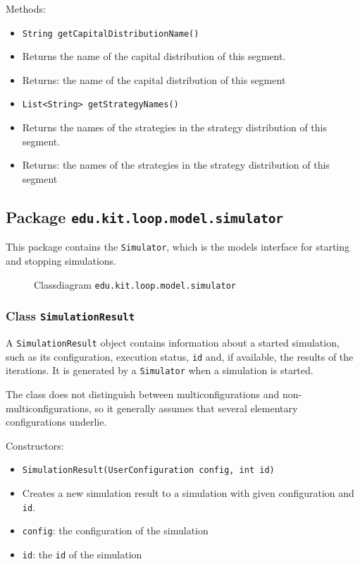 \documentclass[parskip=full,11pt]{scrartcl}
\begin{document}
Methods:
\begin{itemize}\itemsep -10pt
\item \texttt{String getCapitalDistributionName()}
\item[] Returns the name of the capital distribution of this segment.
\item[] Returns: the name of the capital distribution of this segment

\item \texttt{List<String> getStrategyNames()}
\item[] Returns the names of the strategies in the strategy distribution of this segment.
\item[] Returns: the names of the strategies in the strategy distribution of this segment
\end{itemize}


\subsection{Package \texttt{edu.kit.loop.model.simulator}}
This package contains the \texttt{Simulator}, which is the models interface for starting and stopping simulations.
\iftrue
\begin{figure}[h]
	\centering
	\fontsize{4.5}{8}\selectfont
	

	\caption{Classdiagram \texttt{edu.kit.loop.model.simulator}}
\end{figure}
\fi
\subsubsection{Class \texttt{SimulationResult}}
A \texttt{SimulationResult} object contains information about a started simulation, such as its configuration, execution status, \texttt{id} and, if available, the results of the iterations. It is generated by a \texttt{Simulator} when a simulation is started.

The class does not distinguish between multiconfigurations and non-multiconfigurations, so it generally assumes that several elementary configurations underlie.

Constructors:
\begin{itemize} \itemsep -10pt
	\item \texttt{SimulationResult(UserConfiguration config, int id)}
	\item[] Creates a new simulation result to a simulation with given configuration and \texttt{id}.
	\item[] \texttt{config}: the configuration of the simulation
	\item[] \texttt{id}: the \texttt{id} of the simulation
\end{itemize}
\end{document}
